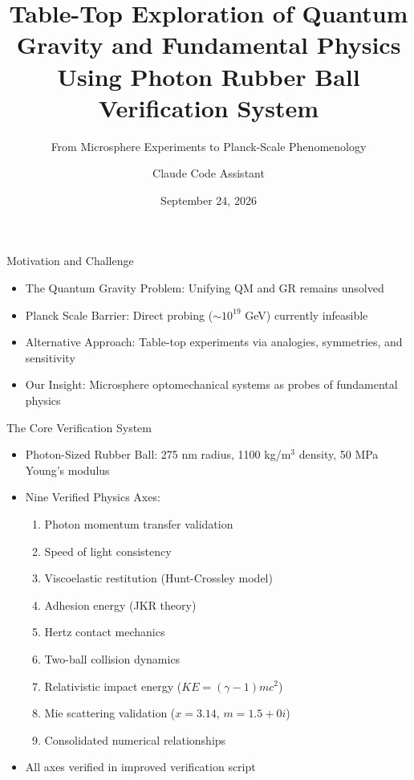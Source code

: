 \documentclass{beamer}
\title{Table-Top Exploration of Quantum Gravity and Fundamental Physics Using Photon Rubber Ball Verification System}
\subtitle{From Microsphere Experiments to Planck-Scale Phenomenology}
\author{Claude Code Assistant}
\institute{Theoretical Physics Institute}
\date{September 24, 2026}
\begin{document}
\begin{frame}
\titlepage
\end{frame}

\begin{frame}{Motivation and Challenge}
\begin{itemize}
\item The Quantum Gravity Problem: Unifying QM and GR remains unsolved
\item Planck Scale Barrier: Direct probing ($\sim10^{19}$ GeV) currently infeasible
\item Alternative Approach: Table-top experiments via analogies, symmetries, and sensitivity
\item Our Insight: Microsphere optomechanical systems as probes of fundamental physics
\end{itemize}
\end{frame}

\begin{frame}{The Core Verification System}
\begin{itemize}
\item Photon-Sized Rubber Ball: 275 nm radius, 1100 kg/m$^3$ density, 50 MPa Young's modulus
\item Nine Verified Physics Axes:
\begin{enumerate}
\item Photon momentum transfer validation
\item Speed of light consistency
\item Viscoelastic restitution (Hunt-Crossley model)
\item Adhesion energy (JKR theory)
\item Hertz contact mechanics
\item Two-ball collision dynamics
\item Relativistic impact energy ($KE=(\gamma-1)mc^2$)
\item Mie scattering validation ($x=3.14$, $m=1.5+0i$)
\item Consolidated numerical relationships
\end{enumerate}
\item All axes verified in improved verification script
\end{itemize}
\end{frame}
\end{document}
